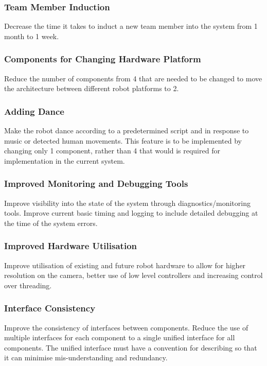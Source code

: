 \documentclass[english,12pt]{scrartcl}
\begin{document}
			\subsubsection{Team Member Induction}
				Decrease the time it takes to induct a new team member into the system from 1 month to 1 week.
			
			\subsubsection{Components for Changing Hardware Platform}
				Reduce the number of components from 4 that are needed to be changed to move the architecture between different robot platforms to 2. 
			
			\subsubsection{Adding Dance}
				Make the robot dance according to a predetermined script and in response to music or detected human movements.
				This feature is to be implemented by changing only 1 component, rather than 4 that would is required for implementation in the current system. 

			\subsubsection{Improved Monitoring and Debugging Tools}
				Improve visibility into the state of the system through diagnostics/monitoring tools.
				Improve current basic timing and logging to include detailed debugging at the time of the system errors. 
			
			\subsubsection{Improved Hardware Utilisation}
				Improve utilisation of existing and future robot hardware to allow for higher resolution on the camera, better use of low level controllers and increasing control over threading.
			
			\subsubsection{Interface Consistency}
				Improve the consistency of interfaces between components.
				Reduce the use of multiple interfaces for each component to a single unified interface for all components.
				The unified interface must have a convention for describing so that it can minimise mis-understanding and redundancy.
				
\end{document}
